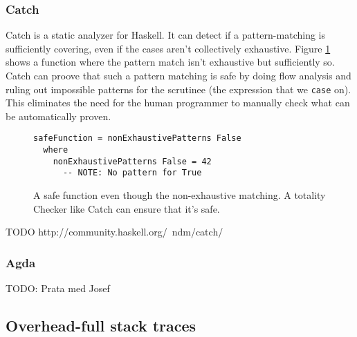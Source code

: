 \subsubsection{Catch}

Catch is a static analyzer for Haskell. It can detect if a pattern-matching is
sufficiently covering, even if the cases aren't collectively exhaustive. Figure
\ref{fig:catch_example} shows a function where the pattern match isn't exhaustive but
sufficiently so.
Catch can proove that such a pattern
matching is safe by doing flow analysis and ruling out impossible
patterns for the scrutinee (the expression that we \texttt{case} on). %
This eliminates the need for the human programmer to manually check what can be
automatically proven. \cite{mitchell:catch_2008_9_25}

\begin{figure}
      \begin{verbatim}
safeFunction = nonExhaustivePatterns False
  where
    nonExhaustivePatterns False = 42
      -- NOTE: No pattern for True
      \end{verbatim}
      \caption{A safe function even though the non-exhaustive matching. A
        totality Checker like Catch can ensure that it's safe.}
      \label{fig:catch_example}
\end{figure}



TODO http://community.haskell.org/~ndm/catch/

\subsubsection{Agda}

TODO: Prata med Josef

\subsection{Overhead-full stack traces}

